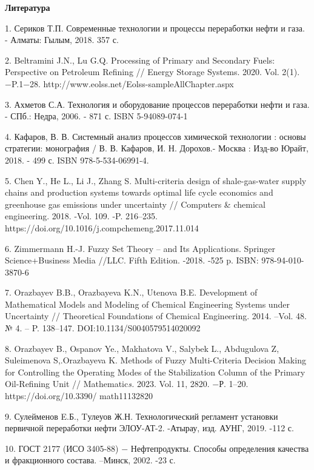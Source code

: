 \begin{center}
    {\bfseries Литература}
\end{center}

\begin{noparindent}
1. Сериков Т.П. Современные технологии и процессы переработки нефти и
газа. - Алматы: Гылым, 2018. 357 с.

2. Beltramini J.N., Lu G.Q. Processing of Primary and Secondary Fuels:
Perspective on Petroleum Refining // Energy Storage Systems. 2020. Vol.
2(1). −P.1−28. http://www.eolss.net/Eolss-sampleAllChapter.aspx

3. Ахметов С.А. Технология и оборудование процессов переработки нефти и
газа. - СПб.: Недра, 2006. - 871 с. ISBN 5-94089-074-1

4. Кафаров, В. В. Системный анализ процессов химической технологии :
основы стратегии: монография / В. В. Кафаров, И. Н. Дорохов.- Москва :
Изд-во Юрайт, 2018. - 499 с. ISBN 978-5-534-06991-4.

5. Chen Y., He L., Li J., Zhang S. Multi-criteria design of
shale-gas-water supply chains and production systems towards optimal
life cycle economics and greenhouse gas emissions under uncertainty //
Computers \& chemical engineering. 2018. -Vol. 109. -P. 216--235.
https://doi.org/10.1016/j.compchemeng.2017.11.014

6. Zimmermann H.-J. Fuzzy Set Theory -- and Its Applications. Springer
Science+Business Media //LLC. Fifth Edition. -2018. -525 p. ISBN:
978-94-010-3870-6

7. Orazbayev B.B., Orazbayeva K.N., Utenova B.E. Development of
Mathematical Models and Modeling of Chemical Engineering Systems under
Uncertainty // Theoretical Foundations of Chemical Engineering. 2014.
--Vol. 48. № 4. -- P. 138--147. DOI:10.1134/S0040579514020092

8. Orazbayev B., Ospanov Ye., Makhatova V., Salybek L., Abdugulova Z,
Suleimenova S,.Orazbayeva K. Methods of Fuzzy Multi-Criteria Decision
Making for Controlling the Operating Modes of the Stabilization Column
of the Primary Oil-Refining Unit // Mathematic\emph{s.} 2023. Vol. 11,
2820. −Р. 1--20. \\https://doi.org/10.3390/ math11132820

9. Сулейменов E.Б., Tулеуов Ж.Н. Технологический регламент установки
первичной переработки нефти ЭЛОУ-АТ-2. -Атырау, изд. АУНГ, 2019. -112 с.

10. ГОСТ 2177 (ИСО 3405-88) − Нефтепродукты. Способы определения
качества и фракционного состава. --Минск, 2002. -23 с.


\end{noparindent}
